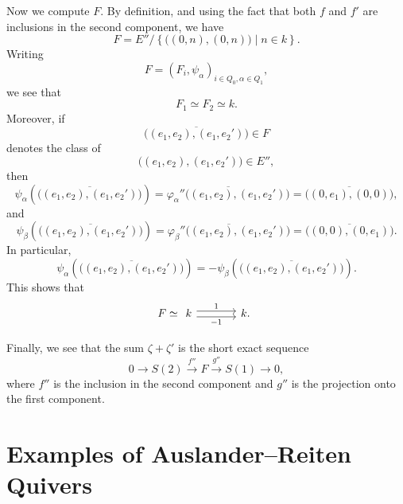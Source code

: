 \documentclass[11pt, a4paper]{report}
\begin{document}
\begin{example}
        Now we compute \(F\). By definition, and using the fact that both \(f\) and \(f'\)
        are inclusions in the second component, we have
        \[
        F
        =
        E''/
        \left\{
        \bigl((0,n),(0,n)\bigr)\mid n\in k
        \right\}.
        \]
        Writing
        \[
        F=(F_i,\psi_\alpha)_{i\in Q_0,\alpha\in Q_1},
        \]
        we see that
        \[
        F_1\simeq F_2\simeq k.
        \]
        Moreover, if
        \[
        \overline{\bigl((e_1,e_2),(e_1,e_2')\bigr)}\in F
        \]
        denotes the class of
        \[
        \bigl((e_1,e_2),(e_1,e_2')\bigr)\in E'',
        \]
        then
        \[
        \psi_\alpha
        \left(
        \overline{\bigl((e_1,e_2),(e_1,e_2')\bigr)}
        \right)
        =
        \overline{
        \varphi_\alpha''
        \bigl((e_1,e_2),(e_1,e_2')\bigr)
        }
        =
        \overline{\bigl((0,e_1),(0,0)\bigr)},
        \]
        and
        \[
        \psi_\beta
        \left(
        \overline{\bigl((e_1,e_2),(e_1,e_2')\bigr)}
        \right)
        =
        \overline{
        \varphi_\beta''
        \bigl((e_1,e_2),(e_1,e_2')\bigr)
        }
        =
        \overline{\bigl((0,0),(0,e_1)\bigr)}.
        \]
        In particular,
        \[
        \psi_\alpha
        \left(
        \overline{\bigl((e_1,e_2),(e_1,e_2')\bigr)}
        \right)
        =
        -
        \psi_\beta
        \left(
        \overline{\bigl((e_1,e_2),(e_1,e_2')\bigr)}
        \right).
        \]
        This shows that
        \[
        F
        \simeq
        \begin{tikzcd}[column sep=large]
        k
        \arrow[r, shift left=0.6ex, "1"]
        \arrow[r, shift right=0.6ex, "-1"']
        &
        k .
        \end{tikzcd}
        \]

        Finally, we see that the sum \(\zeta+\zeta'\) is the short exact sequence
        \[
        0
        \longrightarrow
        S(2)
        \xrightarrow{\,f''\,}
        F
        \xrightarrow{\,g''\,}
        S(1)
        \longrightarrow
        0,
        \]
        where \(f''\) is the inclusion in the second component and \(g''\) is the projection
        onto the first component.
        \end{example}

    \section{Examples of Auslander--Reiten Quivers}
\end{document}
